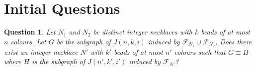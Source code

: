 \documentclass[12]{article}
\newtheorem{question}{Question}
\theoremstyle{definition}
\begin{document}
	\section{Initial Questions}
	
	\begin{question}
		Let $N_1$ and $N_2$ be distinct integer necklaces with $k$ beads of at most $n$ colours.  Let $G$ be the subgraph of $J(n,k,i)$ induced by $\mathcal{F}_{N_1} \cup \mathcal{F}_{N_2}$.  Does there exist an integer necklace $N'$ with $k'$ beads of at most $n'$ colours such that $G \equiv H$ where $H$ is the subgraph of $J(n',k',i')$ induced by $\mathcal{F}_{N'}$?
	\end{question}
	
	
	
	
\end{document}
